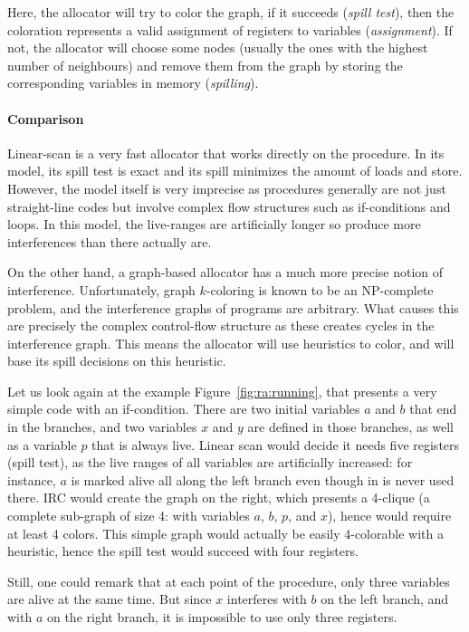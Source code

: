 {Here, the allocator will try to color the graph, if it succeeds (\emph{spill test}), then the coloration represents a valid assignment of registers to variables (\emph{assignment}). If not, the allocator will choose some nodes (usually the ones with the highest number of neighbours) and remove them from the graph by storing the corresponding variables in memory (\emph{spilling}).


\paragraph{Comparison}

Linear-scan is a very fast allocator that works directly on the procedure.
In its model, its spill test is exact and its spill minimizes the amount of loads and store.
However, the model itself is very imprecise as procedures generally are not just straight-line codes but involve complex flow structures such as if-conditions and loops.
In this model, the live-ranges are artificially longer so produce more interferences than there actually are.

On the other hand, a graph-based allocator has a much more precise notion of interference.
Unfortunately, graph $k$-coloring is known to be an NP-complete problem, and the interference graphs of programs are arbitrary.
What causes this are precisely the complex control-flow structure as these creates cycles in the interference graph.
This means the allocator will use heuristics to color, and will base its spill decisions on this heuristic.


Let us look again at the example Figure~\ref{fig:ra:running}, that presents a very 
simple code with an if-condition.
There are two initial variables $a$ and $b$ that end in the branches, and two variables $x$ and $y$ are defined in those branches, as well as a variable $p$ that is always live.
Linear scan would decide it needs five registers (spill test), as the live ranges of all variables are artificially increased: for instance, $a$ is marked alive all along the left branch even though in is never used there.
%
IRC would create the graph on the right, which presents a 4-clique (a complete sub-graph of size 4: with variables $a$, $b$, $p$, and $x$), hence would require at least 4 colors.
This simple graph would actually be easily 4-colorable with a heuristic, hence the spill test would succeed with four registers.

Still, one could remark that at each point of the procedure, only three variables are alive at the same time.
But since $x$ interferes with $b$ on the left branch, and with $a$ on the right branch, it is impossible to use only three registers.

}
